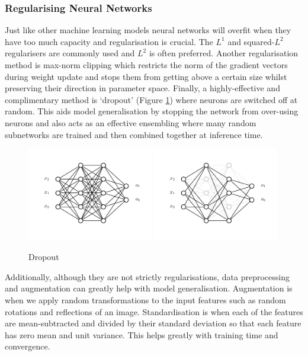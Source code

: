 \subsubsection{Regularising Neural Networks}
Just like other machine learning models neural networks will overfit when they have too much capacity and regularisation is crucial. The $L^{1}$ and squared-$L^{2}$ regularisers are commonly used and $L^{2}$ is often preferred. Another regularisation method is max-norm clipping which restricts the norm of the gradient vectors during weight update and stops them from getting above a certain size whilst preserving their direction in parameter space. Finally, a highly-effective and complimentary method is `dropout' (Figure \ref{fig:machine_learning:dropout})  where neurons are switched off at random. This aids model generalisation by stopping the network from over-using neurons and also acts as an effective ensembling where many random subnetworks are trained and then combined together at inference time.  
\begin{figure}[h!]
    \begin{center}
        \includegraphics[width=0.49\textwidth]{figures/machine_learning/no_dropout.pdf}
        \includegraphics[width=0.49\textwidth]{figures/machine_learning/dropout.pdf}
    \end{center}
    \caption{Dropout}
        \label{fig:machine_learning:dropout}
\end{figure}

Additionally, although they are not strictly regularisations, data preprocessing and augmentation can greatly help with model generalisation. Augmentation is when we apply random transformations to the input features such as random rotations and reflections of an image. Standardisation is when each of the features are mean-subtracted and divided by their standard deviation so that each feature has zero mean and unit variance. This helps greatly with training time and convergence. 


